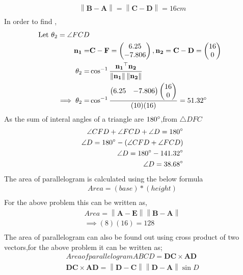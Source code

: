 \documentclass{article}
\providecommand{\norm}[1]{\left\lVert#1\right\rVert}
\newcommand{\myvec}[1]{\ensuremath{\begin{pmatrix}#1\end{pmatrix}}}
\let\vec\mathbf
\begin{document}
\begin{align}
	\norm{\vec{B} - \vec{A}} = \norm{\vec{C} - \vec{D}} = 16cm
	\label{eq:3}\\
\end{align}
\vspace{5mm}
In order to find ,\\
\begin{align}
	\text{ Let }\theta_2 = \angle{FCD}\\
\vec{n_1} = &\vec{C} - \vec{F} = \myvec{6.25\\-7.806}, \vec{n_2} = \vec{C} - \vec{D} = \myvec{16\\0} \\
\theta_2 = &\cos^{-1}\frac{\vec{n_1}^\top\vec{n_2}}{\norm{\vec{n_1}}\norm{\vec{n_2}}} \\
	\implies\theta_2 = &\cos^{-1}\frac{\myvec{6.25&-7.806}\myvec{16\\0}}{(10)(16)} = 51.32\degree
\end{align}
As the sum of interal angles of a triangle are $180\degree$,from $\triangle{DFC}$\\
\begin{align}
	\angle{CFD} + \angle{FCD} + \angle{D} = 180\degree\\
	\angle{D} = 180\degree - (\angle{CFD} + \angle{FCD})\\
	\angle{D} = 180\degree - 141.32\degree \\
	\angle{D} = 38.68\degree
	\label{eq:4}\\
\end{align}
The area of parallelogram is calculated using the below formula\\
\begin{align}
	Area = (base)*(height)\\
\end{align}
For the above problem this can be written as,
\begin{align}
	Area = \norm{\vec{A} - \vec{E}} \norm{\vec{B} - \vec{A}}\\
	\implies (8) (16) = 128
	\label{eq:5}\\
\end{align}
The area of parallelogram can also be found out using cross product of two vectors,for the above problem it can be written as;
\begin{align}
	Area of parallelogram ABCD = \vec{DC} \times \vec{AD}\\
	\vec{DC} \times \vec{AD} = \norm{\vec{D} - \vec{C}} \norm{\vec{D} - \vec{A}} \sin{D}
	\label{eq:6}\\
\end{align}
\end{document}
